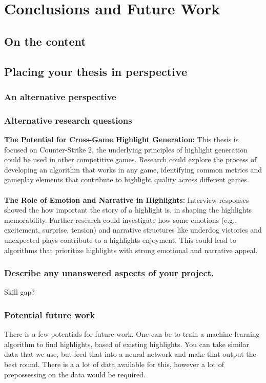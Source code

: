\chapter{Conclusions and Future Work}
\label{chp:conclusions}
\section{On the content}


\section{Placing your thesis in perspective}
\subsection{An alternative perspective}


\subsection{Alternative research questions}
\textbf{The Potential for Cross-Game Highlight Generation:} This thesis is focused on Counter-Strike 2, the underlying principles of highlight generation could be used in other competitive games. Research could explore the process of developing an algorithm that works in any game, identifying common metrics and gameplay elements that contribute to highlight quality across different games.\\\\
\textbf{The Role of Emotion and Narrative in Highlights:} Interview responses showed the how important the story of a highlight is, in shaping the highlights memorability. Further research could investigate how some emotions (e.g., excitement, surprise, tension) and narrative structures like underdog victories and unexpected plays contribute to  a highlights enjoyment. This could lead to algorithms that prioritize highlights with strong emotional and narrative appeal.
\subsection{Describe any unanswered aspects of your project.}
Skill gap?
\subsection{Potential future work}
There is a few potentials for future work. One can be to train a machine learning algorithm to find highlights, based of existing highlights. You can take similar data that we use, but feed that into a neural network and make that output the best round. There is a a lot of data available for this, however a lot of prepossessing on the data would be required.

